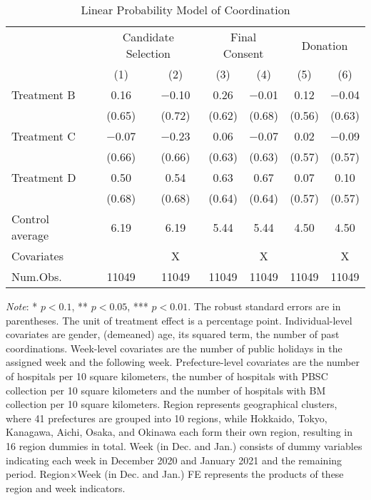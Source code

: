 \documentclass[12pt, a4paper]{article}
\begin{document}
\begin{table}[H]

\caption{\label{tab:coordinate-reg}Linear Probability Model of Coordination}
\centering
\fontsize{8}{10}\selectfont
\begin{threeparttable}
\begin{tabular}[t]{lcccccc}
\toprule
\multicolumn{1}{c}{ } & \multicolumn{2}{c}{Candidate Selection} & \multicolumn{2}{c}{Final Consent} & \multicolumn{2}{c}{Donation} \\
\cmidrule(l{3pt}r{3pt}){2-3} \cmidrule(l{3pt}r{3pt}){4-5} \cmidrule(l{3pt}r{3pt}){6-7}
  & (1) & (2) & (3) & (4) & (5) & (6)\\
\midrule
Treatment B & \num{0.16} & \num{-0.10} & \num{0.26} & \num{-0.01} & \num{0.12} & \num{-0.04}\\
 & (\num{0.65}) & (\num{0.72}) & (\num{0.62}) & (\num{0.68}) & (\num{0.56}) & (\num{0.63})\\
Treatment C & \num{-0.07} & \num{-0.23} & \num{0.06} & \num{-0.07} & \num{0.02} & \num{-0.09}\\
 & (\num{0.66}) & (\num{0.66}) & (\num{0.63}) & (\num{0.63}) & (\num{0.57}) & (\num{0.57})\\
Treatment D & \num{0.50} & \num{0.54} & \num{0.63} & \num{0.67} & \num{0.07} & \num{0.10}\\
 & (\num{0.68}) & (\num{0.68}) & (\num{0.64}) & (\num{0.64}) & (\num{0.57}) & (\num{0.57})\\
\midrule
Control average & 6.19 & 6.19 & 5.44 & 5.44 & 4.50 & 4.50\\
Covariates &  & X &  & X &  & X\\
Num.Obs. & \num{11049} & \num{11049} & \num{11049} & \num{11049} & \num{11049} & \num{11049}\\
\bottomrule
\end{tabular}
\begin{tablenotes}
\item \emph{Note}: * $p < 0.1$, ** $p < 0.05$, *** $p < 0.01$. The robust standard errors are in parentheses. The unit of treatment effect is a percentage point. Individual-level covariates are gender, (demeaned) age, its squared term, the number of past coordinations. Week-level covariates are the number of public holidays in the assigned week and the following week. Prefecture-level covariates are the number of hospitals per 10 square kilometers, the number of hospitals with PBSC collection per 10 square kilometers and the number of hospitals with BM collection per 10 square kilometers. Region represents geographical clusters, where 41 prefectures are grouped into 10 regions, while Hokkaido, Tokyo, Kanagawa, Aichi, Osaka, and Okinawa each form their own region, resulting in 16 region dummies in total. Week (in Dec. and Jan.) consists of dummy variables indicating each week in December 2020 and January 2021 and the remaining period. Region$\times$Week (in Dec. and Jan.) FE represents the products of these region and week indicators.
\end{tablenotes}
\end{threeparttable}
\end{table}
\end{document}
